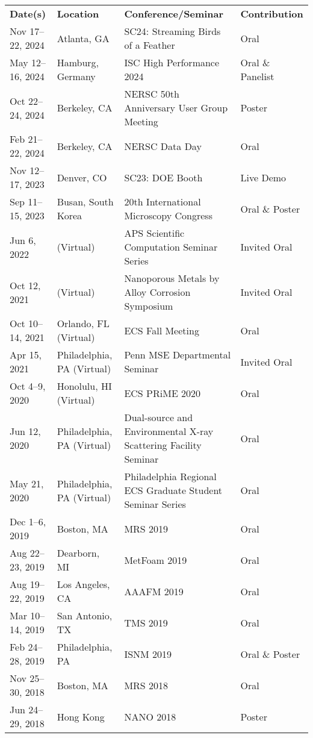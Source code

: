\documentclass[11pt]{article} %
\begin{document}
\begin{center}
  \begin{tabular}{@{\extracolsep{0pt}}>{\centering\arraybackslash}m{3cm}>{\centering\arraybackslash}m{3cm}>{\centering\arraybackslash}m{5.5cm}>{\centering\arraybackslash}m{2.5cm}}
    \rowcolor{white} \textbf{Date(s)} & \textbf{Location} & \textbf{Conference/Seminar} & \textbf{Contribution} \\
    \cmidrule(lr){1-1}\cmidrule(lr){2-2}\cmidrule(lr){3-3}\cmidrule(l){4-4}
    Nov 17--22, 2024 & Atlanta, GA & SC24: Streaming Birds of a Feather & Oral \\
    \rowcolor{verylightgray}May 12--16, 2024 & Hamburg, Germany & ISC High Performance 2024 & Oral \& Panelist \\
    Oct 22--24, 2024 & Berkeley, CA & NERSC 50th Anniversary User Group Meeting & Poster \\
    \rowcolor{verylightgray}Feb 21--22, 2024 & Berkeley, CA & NERSC Data Day & Oral \\
    Nov 12--17, 2023 & Denver, CO & SC23: DOE Booth & Live Demo \\
    \rowcolor{verylightgray}Sep 11--15, 2023 & Busan, South Korea & 20th International Microscopy Congress & Oral \& Poster\\
    Jun 6, 2022 & (Virtual) & APS Scientific Computation Seminar Series & Invited Oral \\
    \rowcolor{verylightgray}Oct 12, 2021 & (Virtual) & Nanoporous Metals by Alloy Corrosion Symposium & Invited Oral \\
    Oct 10--14, 2021 & Orlando, FL (Virtual) & ECS Fall Meeting & Oral \\
    \rowcolor{verylightgray}Apr 15, 2021 & Philadelphia, PA (Virtual) & Penn MSE Departmental Seminar & Invited Oral \\
    Oct 4--9, 2020 & Honolulu, HI (Virtual) & ECS PRiME 2020 & Oral \\
    \rowcolor{verylightgray}Jun 12, 2020 & Philadelphia, PA (Virtual) & Dual-source and Environmental X-ray Scattering Facility Seminar & Oral \\
    May 21, 2020 & Philadelphia, PA (Virtual) & Philadelphia Regional ECS Graduate Student Seminar Series & Oral \\
    \rowcolor{verylightgray}Dec 1--6, 2019 & Boston, MA & MRS 2019 & Oral \\
    Aug 22--23, 2019 & Dearborn, MI & MetFoam 2019 & Oral \\
    \rowcolor{verylightgray}Aug 19--22, 2019 & Los Angeles, CA & AAAFM 2019 & Oral \\
    Mar 10--14, 2019 & San Antonio, TX & TMS 2019 & Oral \\
    \rowcolor{verylightgray}Feb 24--28, 2019 & Philadelphia, PA & ISNM 2019 & Oral \& Poster \\
    Nov 25--30, 2018 & Boston, MA & MRS 2018 & Oral \\
    \rowcolor{verylightgray}Jun 24--29, 2018 & Hong Kong & NANO 2018 & Poster \\
  \end{tabular}
\end{center}
\newpage
\end{document}
